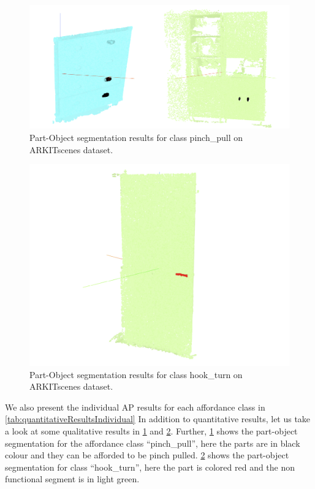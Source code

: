 \begin{figure}[ht!]
    \centering
    \includegraphics[width=\textwidth]{content/images/results/PartObj.png}
    \caption{Part-Object segmentation results for class pinch\_pull on ARKITscenes dataset.}
    \label{fig:task1result1}
\end{figure}

\begin{figure}[ht!]
    \centering
    \includegraphics[width=\textwidth]{content/images/results/PartObj2.png}
    \caption{Part-Object segmentation results for class hook\_turn on ARKITscenes dataset.}
    \label{fig:task1result2}
\end{figure}
We also present the individual AP results for each affordance class in \cref{tab:quantitativeResultsIndividual}
In addition to quantitative results, let us take a look at some qualitative results in \cref{fig:task1result1} and \cref{fig:task1result2}. 
Further, \cref{fig:task1result1} shows the part-object segmentation for the affordance class \enquote{pinch\_pull}, here the parts are in black colour and
they can be afforded to be pinch pulled. \cref{fig:task1result2} shows the part-object segmentation for class \enquote{hook\_turn}, here
the part is colored red and the non functional segment is in light green.

